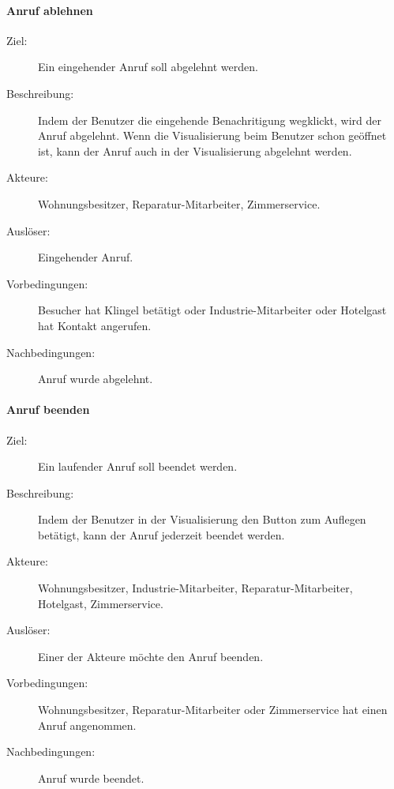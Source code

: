 \paragraph{Anruf ablehnen}
    \begin{description}
        \item[Ziel:] Ein eingehender Anruf soll abgelehnt werden.
        \item[Beschreibung:] Indem der Benutzer die eingehende Benachritigung wegklickt, wird der Anruf abgelehnt.
            Wenn die Visualisierung beim Benutzer schon geöffnet ist, kann der Anruf auch in der Visualisierung abgelehnt werden.
        \item[Akteure:] Wohnungsbesitzer, Reparatur-Mitarbeiter, Zimmerservice.
        \item[Auslöser:] Eingehender Anruf.
        \item[Vorbedingungen:] Besucher hat Klingel betätigt oder Industrie-Mitarbeiter oder Hotelgast hat Kontakt angerufen.
        \item[Nachbedingungen:] Anruf wurde abgelehnt.
    \end{description}

\paragraph{Anruf beenden}
    \begin{description}
        \item[Ziel:] Ein laufender Anruf soll beendet werden.
        \item[Beschreibung:] Indem der Benutzer in der Visualisierung den Button zum Auflegen betätigt, kann der Anruf jederzeit beendet werden.
        \item[Akteure:] Wohnungsbesitzer, Industrie-Mitarbeiter, Reparatur-Mitarbeiter, Hotelgast, Zimmerservice.
        \item[Auslöser:] Einer der Akteure möchte den Anruf beenden.
        \item[Vorbedingungen:] Wohnungsbesitzer, Reparatur-Mitarbeiter oder Zimmerservice hat einen Anruf angenommen.
        \item[Nachbedingungen:] Anruf wurde beendet.
    \end{description}

